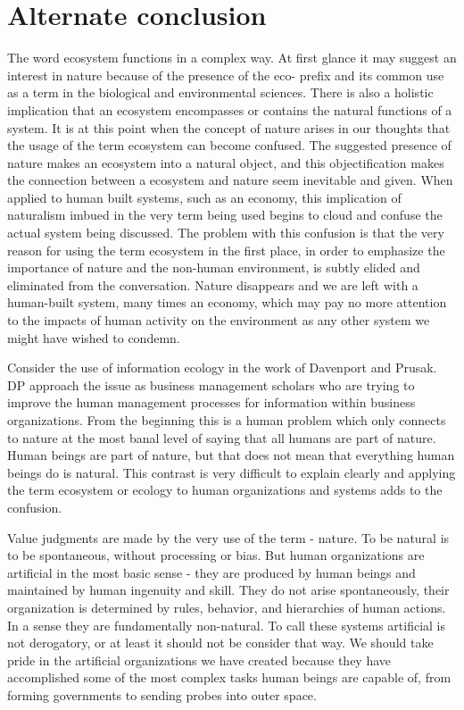 \section{Alternate conclusion}

The word ecosystem functions in a complex way. At first glance it may suggest an interest in nature because of the presence of the eco- prefix and its common use as a term in the biological and environmental sciences. There is also a holistic implication that an ecosystem encompasses or contains the natural functions of a system. It is at this point when the concept of nature arises in our thoughts that the usage of the term ecosystem can become confused. The suggested presence of nature makes an ecosystem into a natural object, and this objectification makes the connection between a ecosystem and nature seem inevitable and given. When applied to human built systems, such as an economy, this implication of naturalism imbued in the very term being used begins to cloud and confuse the actual system being discussed. The problem with this confusion is that the very reason for using the term ecosystem in the first place, in order to emphasize the importance of nature and the non-human environment, is subtly elided and eliminated from the conversation. Nature disappears and we are left with  a human-built system, many times an economy, which may pay no more attention to the impacts of human activity on the environment as any other system we might have wished to condemn.

Consider the use of information ecology in the work of Davenport and Prusak. DP approach the issue as business management scholars who are trying to improve the human management processes for information within business organizations. From the beginning this is a human problem which only connects to nature at the most banal level of saying that all humans are part of nature. Human beings are part of nature, but that does not mean that everything human beings do is natural. This contrast is very difficult to explain clearly and applying the term ecosystem or ecology to human organizations and systems adds to the confusion.

Value judgments are made by the very use of the term - nature. To be natural is to be spontaneous, without processing or bias. But human organizations are artificial in the most basic sense - they are produced by human beings and maintained by human ingenuity and skill. They do not arise spontaneously, their organization is determined by rules, behavior, and hierarchies of human actions. In a sense they are fundamentally non-natural. To call these systems artificial is not derogatory, or at least it should not be consider that way. We should take pride in the artificial organizations we have created because they have accomplished some of the most complex tasks human beings are capable of, from forming governments to sending probes into outer space.

